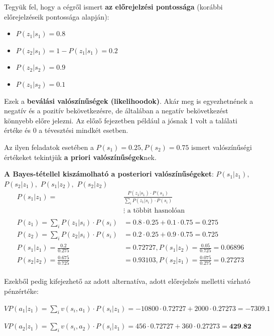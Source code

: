 \documentclass[a4paper,12pt]{article}
\begin{document}
Tegyük fel, hogy a cégről ismert \textbf{az előrejelzési pontossága} (korábbi előrejelzéseik pontossága alapján):
\begin{itemize}
\item $P(z_{1}|s_1) = 0.8$ 
\item $P(z_{2}|s_1) = 1- P(z_{1}|s_1) = 0.2$ 
\item $P(z_{2}|s_2) = 0.9$ 
\item $P(z_{1}|s_2) = 0.1$ 
\end{itemize}
Ezek a \textbf{beválási valószínűségek (likelihoodok)}. Akár meg is egyezhetnének a negatív és a pozitív bekövetkezésre, de általában a negatív bekövetkezést könnyebb előre jelezni. Az előző fejezetben például a jósnak 1 volt a találati értéke és 0 a tévesztési mindkét esetben.

Az ilyen feladatok esetében a $P(s_1) = 0.25 , P(s_2) = 0.75$ ismert valószínűségi értékeket tekintjük \textbf{a priori valószínűségek}nek. 

\textbf{A Bayes-tétellel kiszámolható a posteriori valószínűségeket}: $P(s_1|z_1),$ $P(s_2|z_1),$ $ P(s_1|z_2),$ $P(s_2|z_2)$
\begin{equation}
\begin{split}
P(s_1|z_1) =& \frac{P(z_{1}|s_1) \cdot  P(s_1)}{\sum_{i}^{ } P(z_{1}|s_i) \cdot  P(s_i)} \\
&\vdots \text{ a többit hasnolóan} \\
\\
P(z_1)=\sum_{i}^{ } P(z_{1}|s_i) \cdot  P(s_i) &=  0.8\cdot 0.25+0.1\cdot 0.75 = 0.275 \\
P(z_2)=\sum_{i}^{ } P(z_{2}|s_i) \cdot  P(s_i) &=  0.2\cdot 0.25+0.9\cdot 0.75 = 0.725 \\
P(s_1|z_1) = \frac{0.2}{0.275} &= 0.72727,  
P(s_1|z_2) = \frac{0.05}{0.725} = 0.06896\\
P(s_2|z_2) = \frac{0.675}{0.725} &= 0.93103,  
P(s_2|z_1) = \frac{0.075}{0.275} = 0.27273 \\
\end{split}
\end{equation}

Ezekből pedig kifejezhető az adott alternatíva, adott előrejelzés melletti várható pénzértéke:

$VP(a_1|z_1) = \sum_{i}^{ }v(s_i,a_1)\cdot P(s_i|z_1) = -10800\cdot 0.72727 + 2000\cdot 0.27273 = -7309.1$ 
 
$VP(a_2|z_1) = \sum_{i}v(s_i,a_2)\cdot P(s_i|z_1) = 456\cdot 0.72727 + 360\cdot 0.27273 = \textbf{429.82}$ 
\end{document}
